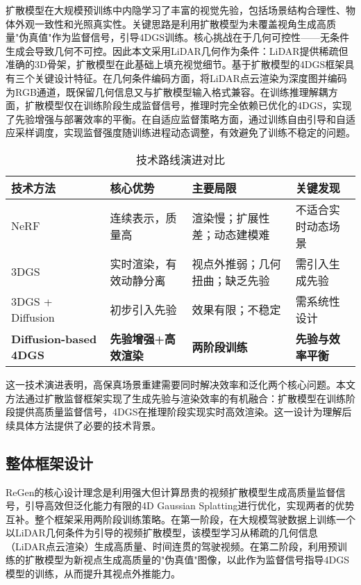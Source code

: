 扩散模型在大规模预训练中内隐学习了丰富的视觉先验，包括场景结构合理性、物体外观一致性和光照真实性。关键思路是利用扩散模型为未覆盖视角生成高质量"伪真值"作为监督信号，引导4DGS训练。核心挑战在于几何可控性——无条件生成会导致几何不可控。因此本文采用LiDAR几何作为条件：LiDAR提供稀疏但准确的3D骨架，扩散模型在此基础上填充视觉细节。基于扩散模型的4DGS框架具有三个关键设计特征。在几何条件编码方面，将LiDAR点云渲染为深度图并编码为RGB通道，既保留几何信息又与扩散模型输入格式兼容。在训练推理解耦方面，扩散模型仅在训练阶段生成监督信号，推理时完全依赖已优化的4DGS，实现了先验增强与部署效率的平衡。在自适应监督策略方面，通过训练自由引导和自适应采样调度，实现监督强度随训练进程动态调整，有效避免了训练不稳定的问题。

\begin{table}[htbp]
\centering
\caption{技术路线演进对比}
\label{tab:technical-evolution}
\small
\begin{tabular}{p{2.2cm}p{3.2cm}p{4cm}p{2.8cm}}
\toprule
\textbf{技术方法} & \textbf{核心优势} & \textbf{主要局限} & \textbf{关键发现} \\
\midrule
NeRF & 连续表示，质量高 & 渲染慢；扩展性差；动态建模难 & 不适合实时动态场景 \\
\midrule
3DGS & 实时渲染，有效动静分离 & 视点外推弱；几何扭曲；缺乏先验 & 需引入生成先验 \\
\midrule
3DGS + Diffusion & 初步引入先验 & 效果有限；不稳定 & 需系统性设计 \\
\midrule
\textbf{Diffusion-based 4DGS} & \textbf{先验增强+高效渲染} & \textbf{两阶段训练} & \textbf{先验与效率平衡} \\
\bottomrule
\end{tabular}
\end{table}

这一技术演进表明，高保真场景重建需要同时解决效率和泛化两个核心问题。本文方法通过扩散监督框架实现了生成先验与渲染效率的有机融合：扩散模型在训练阶段提供高质量监督信号，4DGS在推理阶段实现实时高效渲染。这一设计为理解后续具体方法提供了必要的技术背景。

\subsection{整体框架设计}

ReGen的核心设计理念是利用强大但计算昂贵的视频扩散模型生成高质量监督信号，引导高效但泛化能力有限的4D Gaussian Splatting进行优化，实现两者的优势互补。整个框架采用两阶段训练策略。在第一阶段，在大规模驾驶数据上训练一个以LiDAR几何条件为引导的视频扩散模型，该模型学习从稀疏的几何信息（LiDAR点云渲染）生成高质量、时间连贯的驾驶视频。在第二阶段，利用预训练的扩散模型为新视点生成高质量的"伪真值"图像，以此作为监督信号指导4DGS模型的训练，从而提升其视点外推能力。

